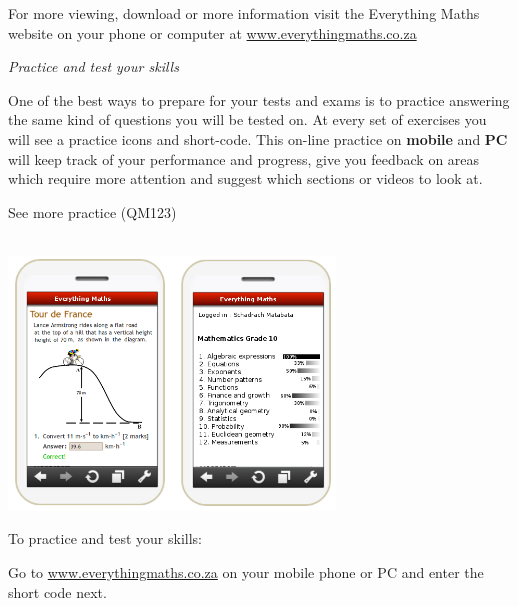 \newpage
\thispagestyle{empty}
{\Large

For more viewing, download or more information visit the Everything Maths website on your phone or
computer at \underline{www.everythingmaths.co.za}  \par
\vspace*{1cm}
{\normalfont\sffamily\fontsize{22}\normalfont\itshape Practice and test your skills} \par


One of the best ways to prepare for your tests and exams is to practice answering the same kind of
questions you will be tested on. At every set of exercises you will see a practice icons and short-code.
This on-line practice on \textbf{mobile} and \textbf{PC} will keep track of your performance and progress, give you
feedback on areas which require more attention and suggest which sections or videos to look at.

\begin{center}
\caption{See more practice  (QM123)} \\
\includegraphics[width=0.65\textwidth]{../title_images/practicephones.png}
\end{center}
\par



To practice and test your skills:\par

Go to \underline{www.everythingmaths.co.za} on your mobile phone or PC and enter the short code next.\par

\vspace*{1cm}


}
